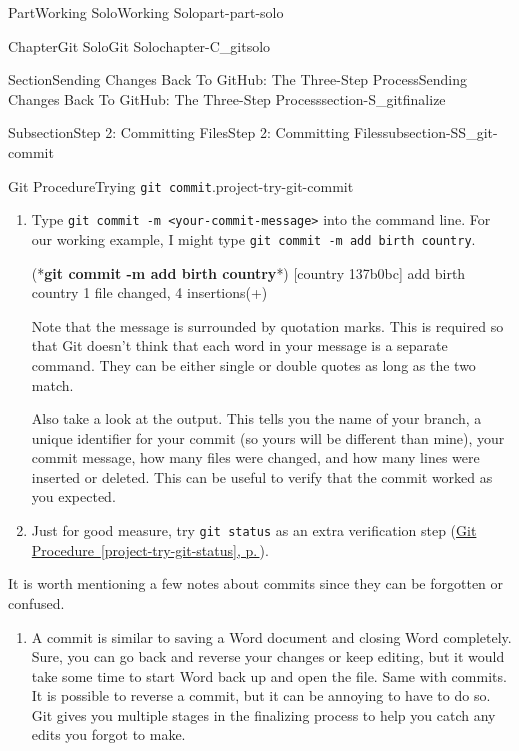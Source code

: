 \documentclass[twoside,10pt,]{book}
\newcommand{\xreffont}{\relax}
\newcommand{\mono}[1]{\texttt{#1}}
\newcommand{\consoleinput}[1]{\textbf{#1}}
\begin{document}
\begin{partptx}{Part}{Working Solo}{}{Working Solo}{}{}{part-part-solo}
\begin{chapterptx}{Chapter}{Git Solo}{}{Git Solo}{}{}{chapter-C_gitsolo}
\begin{sectionptx}{Section}{Sending Changes Back To GitHub: The Three-Step Process}{}{Sending Changes Back To GitHub: The Three-Step Process}{}{}{section-S_gitfinalize}
\begin{subsectionptx}{Subsection}{Step 2: Committing Files}{}{Step 2: Committing Files}{}{}{subsection-SS_git-commit}
\begin{project}{Git Procedure}{Trying \mono{git commit}.}{project-try-git-commit}
\begin{enumerate}[font=\bfseries,label=(\alph*),ref=\alph*]
\par
Do keep in mind the guidelines expressed in \hyperref[assemblage-commitmessages]{A Note On Commit Messages, p.\,\pageref{assemblage-commitmessages}}. They apply here, too! (And any other time you are committing.)%
\item{}Type \mono{git commit -m \textquotedbl{}<your-commit-message>\textquotedbl{}} into the command line. For our working example, I might type \mono{git commit -m \textquotedbl{}add birth country\textquotedbl{}}.%
\begin{console}{0}{1}{0}
(*\consoleinput{git commit -m \textquotedbl{}add birth country\textquotedbl{}}*)
[country 137b0bc] add birth country
 1 file changed, 4 insertions(+)
\end{console}
Note that the message is surrounded by quotation marks. This is required so that Git doesn't think that each word in your message is a separate command. They can be either single or double quotes as long as the two match.%
\par
Also take a look at the output. This tells you the name of your branch, a unique identifier for your commit (so yours will be different than mine), your commit message, how many files were changed, and how many lines were inserted or deleted. This can be useful to verify that the commit worked as you expected.%
\item{}Just for good measure, try \mono{git status} as an extra verification step (\hyperref[project-try-git-status]{Git Procedure~{\xreffont\ref{project-try-git-status}}, p.\,\pageref{project-try-git-status}}).%
\end{enumerate}%
\end{project}%
 It is worth mentioning a few notes about commits since they can be forgotten or confused.%
\begin{enumerate}
\item{}A commit is similar to saving a Word document and closing Word completely. Sure, you can go back and reverse your changes or keep editing, but it would take some time to start Word back up and open the file. Same with commits. It is possible to reverse a commit, but it can be annoying to have to do so. Git gives you multiple stages in the finalizing process to help you catch any edits you forgot to make.%

\end{enumerate}
\end{subsectionptx}
\end{sectionptx}
\end{chapterptx}
\end{partptx}
\end{document}
